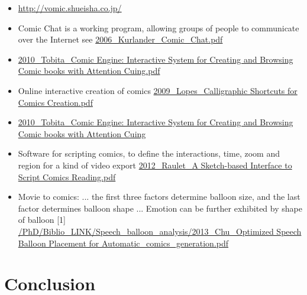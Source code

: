 \begin{itemize}
	\item \url{http://vomic.shueisha.co.jp/}
	\item Comic Chat is a working program, allowing groups of people to communicate over the Internet see \url{2006_Kurlander_Comic_Chat.pdf}
	\item \url{2010_Tobita_Comic Engine: Interactive System for Creating and Browsing Comic books with Attention Cuing.pdf}
	\item Online interactive creation of comics \url{2009_Lopes_Calligraphic Shortcuts for Comics Creation.pdf}
	\item \url{2010_Tobita_Comic Engine: Interactive System for Creating and Browsing Comic books with Attention Cuing}
	\item Software for scripting comics, to define the interactions, time, zoom and region for a kind of video export \url{2012_Raulet_A Sketch-based Interface to Script Comics Reading.pdf}
	\item Movie to comics: ... the first three factors determine balloon size, and the last factor determines balloon shape ... Emotion can be further exhibited by shape of balloon [1] \url{/PhD/Biblio_LINK/Speech_balloon_analysis/2013_Chu_Optimized Speech Balloon Placement for Automatic_comics_generation.pdf}
\end{itemize}

\section{Conclusion}
\label{sec:sota:conclusion}


